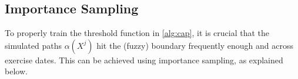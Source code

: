 

 
\subsection{Importance Sampling}





To properly train the threshold function in \cref{alg:cap}, 
it is  crucial  that the simulated paths $\alpha(X^{j})$ hit the (fuzzy) boundary frequently enough and  across exercise dates. 
This can be achieved using importance sampling, as explained below.  %

